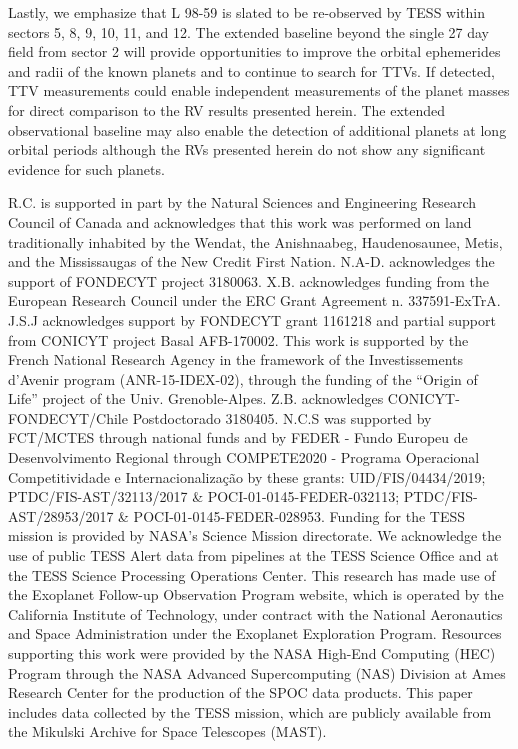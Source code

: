 \documentclass[longauth]{aa}
\begin{document}
Lastly, we emphasize that L 98-59 is slated to be re-observed by TESS within sectors 5, 8, 9, 10, 11, and 12. The extended baseline beyond the single 27 day field from sector 2 will provide opportunities to improve the orbital ephemerides and radii of the known planets and to continue to search for TTVs. If detected, TTV measurements could enable independent measurements of the planet masses for direct comparison to the RV results presented herein. The extended observational baseline may also enable the detection of additional planets at long orbital periods although the RVs presented herein do not show any significant evidence for such planets.



\begin{acknowledgements}
  R.C. is supported in part by the Natural Sciences and Engineering Research Council of Canada and 
  acknowledges that this work was performed on land traditionally inhabited by the Wendat, the Anishnaabeg, Haudenosaunee, Metis, and the
  Mississaugas of the New Credit First Nation.
  N.A-D. acknowledges the support of FONDECYT project 3180063. 
  X.B. acknowledges funding from the European Research Council under the ERC Grant Agreement n. 337591-ExTrA.
  J.S.J acknowledges support by FONDECYT grant 1161218 and partial support from CONICYT project Basal AFB-170002.
  This work is supported by the French National Research Agency in the  framework of the Investissements d’Avenir program (ANR-15-IDEX-02), through the funding of the ``Origin of Life'' project of the Univ. Grenoble-Alpes. 
  Z.B. acknowledges CONICYT-FONDECYT/Chile Postdoctorado 3180405.
  N.C.S was supported by FCT/MCTES through national funds and by FEDER - Fundo Europeu de Desenvolvimento Regional through COMPETE2020 - Programa Operacional Competitividade e Internacionalização by these grants: UID/FIS/04434/2019; PTDC/FIS-AST/32113/2017 \& POCI-01-0145-FEDER-032113; PTDC/FIS-AST/28953/2017 \& POCI-01-0145-FEDER-028953.
  Funding for the TESS mission is provided by NASA's Science Mission directorate.
  We acknowledge the use of public TESS Alert data from pipelines at the TESS Science Office and at the TESS Science Processing Operations Center.
  This research has made use of the Exoplanet Follow-up Observation Program website, which is operated by the California Institute of Technology, under contract with the National Aeronautics and Space Administration under the Exoplanet Exploration Program.
  Resources supporting this work were provided by the NASA High-End Computing (HEC) Program through the NASA Advanced Supercomputing (NAS) Division at Ames Research Center for the production of the SPOC data products.
  This paper includes data collected by the TESS mission, which are publicly available from the Mikulski Archive for Space Telescopes (MAST).
\end{acknowledgements}
\end{document}
